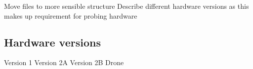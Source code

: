 Move files to more sensible structure
Describe different hardware versions as this makes up requirement for probing hardware

\subsection{Hardware versions}
Version 1
Version 2A
Version 2B
Drone

